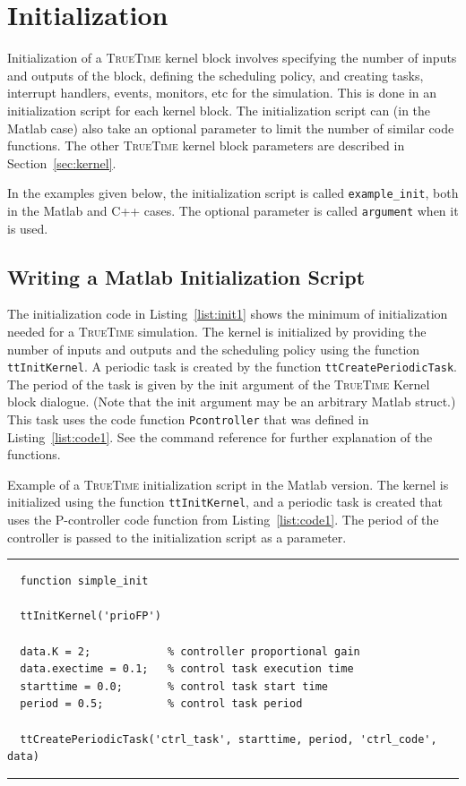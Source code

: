 \documentclass[final,twoside]{rapport}
\begin{document}
\section{Initialization}
\label{sec:initialization}
Initialization of a \textsc{TrueTime} kernel block involves specifying
the number of inputs and outputs of the block, defining the scheduling
policy, and creating tasks, interrupt handlers, events, monitors, etc
for the simulation. This is done in an initialization script for each
kernel block. The initialization script can (in the Matlab case) also
take an optional parameter to limit the number of similar code
functions. The other \textsc{TrueTime} kernel block parameters are
described in Section~\ref{sec:kernel}.

In the examples given below, the initialization script is called
\texttt{example\_init}, both in the Matlab and C++ cases. The optional
parameter is called {\tt argument} when it is used.

\subsection{Writing a Matlab Initialization Script}
\label{sec:minit}
The initialization code in Listing~\ref{list:init1} shows the minimum
of initialization needed for a \textsc{TrueTime} simulation. The
kernel is initialized by providing the number of inputs and outputs
and the scheduling policy using the function \texttt{ttInitKernel}. A
periodic task is created by the function
\texttt{ttCreatePeriodicTask}. The period of the task is given by the
init argument of the \textsc{TrueTime} Kernel block dialogue. (Note that the init argument may
be an arbitrary Matlab struct.) This task uses the code function
\texttt{Pcontroller} that was defined in Listing~\ref{list:code1}. See
the command reference for further explanation of the functions.

\begin{listing}[b]\small
\caption{Example of a \textsc{TrueTime} initialization script in the
  Matlab version. The kernel is initialized using the function
  \texttt{ttInitKernel}, and a periodic task is created that uses the
  P-controller code function from Listing~\ref{list:code1}. The period
of the controller is passed to the initialization script as a parameter.}
\label{list:init1}
\vspace{3mm}
\hrule
\begin{verbatim}
  function simple_init

  ttInitKernel('prioFP')

  data.K = 2;            % controller proportional gain
  data.exectime = 0.1;   % control task execution time
  starttime = 0.0;       % control task start time
  period = 0.5;          % control task period

  ttCreatePeriodicTask('ctrl_task', starttime, period, 'ctrl_code', data)
\end{verbatim}
\hrule
\end{listing}
\end{document}
